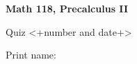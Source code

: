 
\begin{minipage}{.3\textwidth}
  \centerline{\bf Math 118, Precalculus II}
  \medskip
  \centerline{Quiz <+number and date+>}
\end{minipage}%
\begin{minipage}{.7\textwidth}
  \hfill\large {} \hfill \else Print name:\enspace\hrulefill \fi
\end{minipage}

  \medskip

